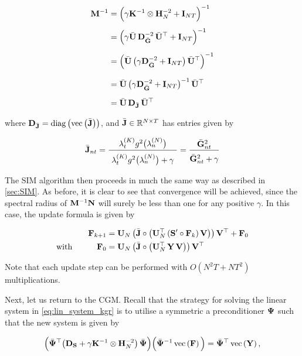 \begin{align}
    \label{eq:M_inv_kgr}
    \mathbf{M}^{-1} &= \Big(\gamma \mathbf{K}^{-1} \otimes \mathbf{H}_N^{-2} + \mathbf{I}_{NT}\Big)^{-1} \notag \\[0.15cm]
    &= \Big(\gamma \bar{\mathbf{U}} \, \mathbf{D}_{\bar{\mathbf{G}}}^{-2} \, \bar{\mathbf{U}}^\top + \mathbf{I}_{NT}\Big)^{-1} \notag \\[0.2cm]
    &= \Big(\bar{\mathbf{U}} \, \big( \gamma \mathbf{D}_{\bar{\mathbf{G}}}^{-2} + \mathbf{I}_{NT} \big) \, \bar{\mathbf{U}}^\top\Big)^{-1} \notag \\[0.25cm]
    &= \bar{\mathbf{U}} \, \big( \gamma \mathbf{D}_{\bar{\mathbf{G}}}^{-2} + \mathbf{I}_{NT} \big)^{-1} \, \bar{\mathbf{U}}^\top \notag \\[0.2cm]
    &= \bar{\mathbf{U}} \, \mathbf{D}_{\bar{\mathbf{J}}} \, \bar{\mathbf{U}}^\top 
\end{align}

where $\mathbf{D}_{\bar{\mathbf{J}}} = \text{\textup{diag}}\left(\text{\textup{vec}}\left(\bar{\mathbf{J}}\right)\right)$, and $\bar{\mathbf{J}} \in \mathbb{R}^{N \times T}$ has entries given by 

\begin{equation}
    \label{eq:Jnt2}
    \bar{\J}_{nt} = \frac{\lambda^{(K)}_t g^2\big(\lambda_n^{(N)}\big)}{ \raisebox{-0.2cm} { $\lambda^{(K)}_t g^2\big(\lambda_n^{(N)}\big) + \gamma$ } } = \frac{\bar{\G}_{nt}^2}{ \raisebox{-0.15cm} {$\bar{\G}_{nt}^2 + \gamma$}}
\end{equation}

The SIM algorithm then proceeds in much the same way as described in \cref{sec:SIM}. As before, it is clear to see that convergence will be achieved, since the spectral radius of $\mathbf{M}^{-1}\mathbf{N}$ will surely be less than one for any positive $\gamma$. In this case, the update formula is given by 

\begin{align}
    \label{eq:update_sim_kgr}
    \mathbf{F}_{k+1} & = \mathbf{U}_N \, \big( \bar{\mathbf{J}}  \circ \big( \mathbf{U}_N^\top \, (\mathbf{S}' \circ \mathbf{F}_{k})\, \mathbf{V} \big) \big) \, \mathbf{V}^\top + \mathbf{F}_0 \\
    \label{eq:update_sim_kgr2}
    \text{with} \quad\quad\quad \mathbf{F}_0 & = \mathbf{U}_N \, \big( \bar{\mathbf{J}}  \circ \big( \mathbf{U}_N^\top \, \mathbf{Y} \, \mathbf{V} \big) \big) \, \mathbf{V}^\top 
\end{align}

Note that each update step can be performed with $O(N^2T + NT^2)$ multiplications. 

Next, let us return to the CGM. Recall that the strategy for solving the linear system in \cref{eq:lin_system_kgr} is to utilise a symmetric a preconditioner $\mathbf{\Psi}$ such that the new system is given by 

\begin{equation}
    \Big(\bar{\mathbf{\Psi}} ^\top  \big(\mathbf{D}_{\mathbf{S}} + \gamma \mathbf{K}^{-1} \otimes \mathbf{H}_N^{-2} \big) \, \bar{\mathbf{\Psi}}   \Big) \Big(\bar{\mathbf{\Psi}} ^{-1}\, \text{\textup{vec}}\left( \mathbf{F} \right) \Big) = \bar{\mathbf{\Psi}} ^\top \, \text{\textup{vec}}\left(\mathbf{Y}\right),
\end{equation}

